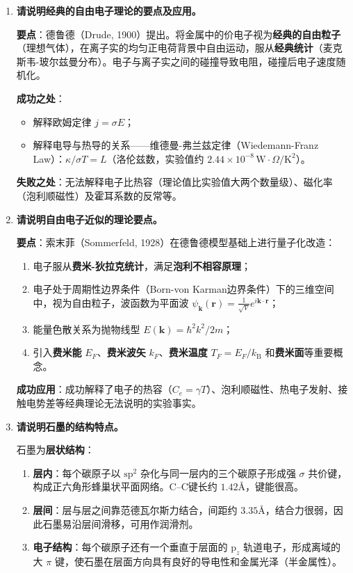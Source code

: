 \begin{enumerate}[label=\textbf{\arabic*.}, leftmargin=2em, itemsep=0.8em, resume]
\item \textbf{请说明经典的自由电子理论的要点及应用。}

\textbf{要点}：德鲁德（Drude, 1900）提出。将金属中的价电子视为\textbf{经典的自由粒子}（理想气体），在离子实的均匀正电荷背景中自由运动，服从\textbf{经典统计}（麦克斯韦-玻尔兹曼分布）。电子与离子实之间的碰撞导致电阻，碰撞后电子速度随机化。

\textbf{成功之处}：
\begin{itemize}[nosep]
    \item 解释欧姆定律 $j = \sigma E$；
    \item 解释电导与热导的关系——维德曼-弗兰兹定律（Wiedemann-Franz Law）：$\kappa/\sigma T = L$（洛伦兹数，实验值约 $2.44\times 10^{-8}\,\text{W}\cdot\Omega/\text{K}^2$）。
\end{itemize}

\textbf{失败之处}：无法解释电子比热容（理论值比实验值大两个数量级）、磁化率（泡利顺磁性）及霍耳系数的反常等。

\item \textbf{请说明自由电子近似的理论要点。}

\textbf{要点}：索末菲（Sommerfeld, 1928）在德鲁德模型基础上进行量子化改造：
\begin{enumerate}[nosep, label=(\arabic*)]
    \item 电子服从\textbf{费米-狄拉克统计}，满足\textbf{泡利不相容原理}；
    \item 电子处于周期性边界条件（Born-von Karman边界条件）下的三维空间中，视为自由粒子，波函数为平面波 $\psi_{\mathbf{k}}(\mathbf{r}) = \frac{1}{\sqrt{V}}e^{i\mathbf{k}\cdot\mathbf{r}}$；
    \item 能量色散关系为抛物线型 $E(\mathbf{k}) = \hbar^2k^2/2m$；
    \item 引入\textbf{费米能} $E_F$、\textbf{费米波矢} $k_F$、\textbf{费米温度} $T_F = E_F/k_{\text{B}}$ 和\textbf{费米面}等重要概念。
\end{enumerate}

\textbf{成功应用}：成功解释了电子的热容（$C_e = \gamma T$）、泡利顺磁性、热电子发射、接触电势差等经典理论无法说明的实验事实。

\item \textbf{请说明石墨的结构特点。}

石墨为\textbf{层状结构}：
\begin{enumerate}[nosep, label=(\arabic*)]
    \item \textbf{层内}：每个碳原子以 $\text{sp}^2$ 杂化与同一层内的三个碳原子形成强 $\sigma$ 共价键，构成正六角形蜂巢状平面网络。C--C键长约 $1.42$\AA，键能很高。
    \item \textbf{层间}：层与层之间靠范德瓦尔斯力结合，间距约 $3.35$\AA，结合力很弱，因此石墨易沿层间滑移，可用作润滑剂。
    \item \textbf{电子结构}：每个碳原子还有一个垂直于层面的 $\text{p}_z$ 轨道电子，形成离域的大 $\pi$ 键，使石墨在层面方向具有良好的导电性和金属光泽（半金属性）。
\end{enumerate}


\end{enumerate}
